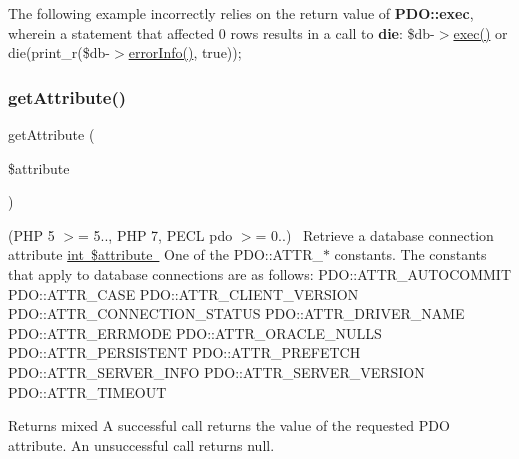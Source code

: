 The following example incorrectly relies on the return value of {\bfseries P\+D\+O\+::exec}, wherein a statement that affected 0 rows results in a call to {\bfseries die}\+: {\ttfamily  \$db-\/$>$\mbox{\hyperlink{interface_pes_1_1_database_1_1_handler_1_1_p_d_o_interface_aa14a8f8ef2c7ed2b8985d28b336941c9}{exec()}} or die(print\+\_\+r(\$db-\/$>$\mbox{\hyperlink{interface_pes_1_1_database_1_1_handler_1_1_p_d_o_interface_ac5230ce6cd46c5e922146a441d807877}{error\+Info()}}, true)); } \mbox{\label{interface_pes_1_1_database_1_1_handler_1_1_p_d_o_interface_ac8ff6f1aa68f8462ac6c3593c8071cc6}} 
\subsubsection{\texorpdfstring{get\+Attribute()}{getAttribute()}}
{\footnotesize\ttfamily get\+Attribute (\begin{DoxyParamCaption}\item[{}]{\$attribute }\end{DoxyParamCaption})}

(P\+HP 5 $>$= 5.., P\+HP 7, P\+E\+CL pdo $>$= 0..)~\newline
 Retrieve a database connection attribute \mbox{\hyperlink{}{int \$attribute }} One of the P\+D\+O\+::\+A\+T\+T\+R\+\_\+$\ast$ constants. The constants that apply to database connections are as follows\+: P\+D\+O\+::\+A\+T\+T\+R\+\_\+\+A\+U\+T\+O\+C\+O\+M\+M\+IT P\+D\+O\+::\+A\+T\+T\+R\+\_\+\+C\+A\+SE P\+D\+O\+::\+A\+T\+T\+R\+\_\+\+C\+L\+I\+E\+N\+T\+\_\+\+V\+E\+R\+S\+I\+ON P\+D\+O\+::\+A\+T\+T\+R\+\_\+\+C\+O\+N\+N\+E\+C\+T\+I\+O\+N\+\_\+\+S\+T\+A\+T\+US P\+D\+O\+::\+A\+T\+T\+R\+\_\+\+D\+R\+I\+V\+E\+R\+\_\+\+N\+A\+ME P\+D\+O\+::\+A\+T\+T\+R\+\_\+\+E\+R\+R\+M\+O\+DE P\+D\+O\+::\+A\+T\+T\+R\+\_\+\+O\+R\+A\+C\+L\+E\+\_\+\+N\+U\+L\+LS P\+D\+O\+::\+A\+T\+T\+R\+\_\+\+P\+E\+R\+S\+I\+S\+T\+E\+NT P\+D\+O\+::\+A\+T\+T\+R\+\_\+\+P\+R\+E\+F\+E\+T\+CH P\+D\+O\+::\+A\+T\+T\+R\+\_\+\+S\+E\+R\+V\+E\+R\+\_\+\+I\+N\+FO P\+D\+O\+::\+A\+T\+T\+R\+\_\+\+S\+E\+R\+V\+E\+R\+\_\+\+V\+E\+R\+S\+I\+ON P\+D\+O\+::\+A\+T\+T\+R\+\_\+\+T\+I\+M\+E\+O\+UT 

\begin{DoxyReturn}{Returns}
mixed A successful call returns the value of the requested P\+DO attribute. An unsuccessful call returns null. 
\end{DoxyReturn}
\mbox{\label{interface_pes_1_1_database_1_1_handler_1_1_p_d_o_interface_ad9bdac1c5dfa2d96210795e7711b8b93}} 
